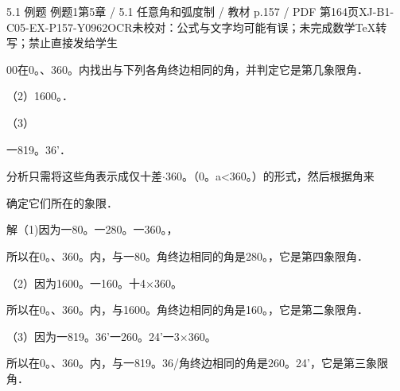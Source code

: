 \begin{bankitem}{5.1 例题 例题1}{第5章 / 5.1 任意角和弧度制 / 教材 p.157 / PDF 第164页}{XJ-B1-C05-EX-P157-Y0962}{OCR未校对：公式与文字均可能有误；未完成数学TeX转写；禁止直接发给学生}
\begin{ocrdraft}
\par
00在0。、360。内找出与下列各角终边相同的角，并判定它是第几象限角．
\par
（2）1600。．
\par
（3）
\par
一819。36'．
\par
分析只需将这些角表示成仅十差\ensuremath{\cdot}360。（0。a<360。）的形式，然后根据角来
\par
确定它们所在的象限．
\par
解（1)因为一80。一280。一360。，
\par
所以在0。、360。内，与一80。角终边相同的角是280。，它是第四象限角．
\par
（2）因为1600。一160。十4\ensuremath{\times}360。
\par
所以在0。、360。内，与1600。角终边相同的角是160。，它是第二象限角．
\par
（3）因为一819。36'一260。24'一3\ensuremath{\times}360。
\par
所以在0。、360。内，与一819。36/角终边相同的角是260。24'，它是第三象限角．
\end{ocrdraft}
\end{bankitem}
